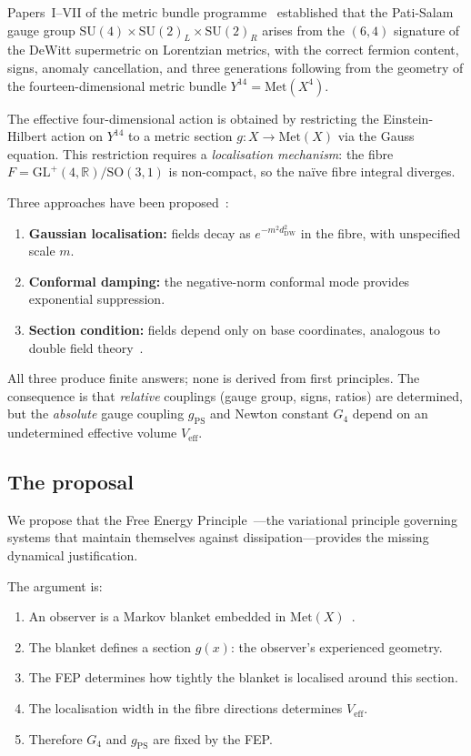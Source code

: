 \documentclass[12pt, a4paper]{article}
\theoremstyle{definition}
\theoremstyle{remark}
\newcommand{\R}{\mathbb{R}}
\newcommand{\Met}{\mathrm{Met}}
\newcommand{\SU}{\mathrm{SU}}
\newcommand{\SO}{\mathrm{SO}}
\newcommand{\GL}{\mathrm{GL}}
\newcommand{\Veff}{V_{\mathrm{eff}}}
\newcommand{\gPS}{g_{\mathrm{PS}}}
\begin{document}
Papers~I--VII of the metric bundle programme~\cite{Paper1,Paper3,Paper7} established that the Pati-Salam gauge group $\SU(4) \times \SU(2)_L \times \SU(2)_R$ arises from the $(6,4)$ signature of the DeWitt supermetric on Lorentzian metrics, with the correct fermion content, signs, anomaly cancellation, and three generations following from the geometry of the fourteen-dimensional metric bundle $Y^{14} = \Met(X^4)$.

The effective four-dimensional action is obtained by restricting the Einstein-Hilbert action on $Y^{14}$ to a metric section $g: X \to \Met(X)$ via the Gauss equation.
This restriction requires a \emph{localisation mechanism}: the fibre $F = \GL^+(4,\R)/\SO(3,1)$ is non-compact, so the na\"ive fibre integral diverges.

Three approaches have been proposed~\cite{Paper1,Paper3}:
\begin{enumerate}[nosep]
\item \textbf{Gaussian localisation:} fields decay as $e^{-m^2 d^2_{\mathrm{DW}}}$ in the fibre, with unspecified scale $m$.
\item \textbf{Conformal damping:} the negative-norm conformal mode provides exponential suppression.
\item \textbf{Section condition:} fields depend only on base coordinates, analogous to double field theory~\cite{HullZwiebach2009}.
\end{enumerate}
All three produce finite answers; none is derived from first principles.
The consequence is that \emph{relative} couplings (gauge group, signs, ratios) are determined, but the \emph{absolute} gauge coupling $\gPS$ and Newton constant $G_4$ depend on an undetermined effective volume $\Veff$.

\subsection{The proposal}

We propose that the Free Energy Principle~\cite{Friston2010,Friston2019}---the variational principle governing systems that maintain themselves against dissipation---provides the missing dynamical justification.

The argument is:
\begin{enumerate}[nosep]
\item An observer is a Markov blanket embedded in $\Met(X)$~\cite{Paper6}.
\item The blanket defines a section $g(x)$: the observer's experienced geometry.
\item The FEP determines how tightly the blanket is localised around this section.
\item The localisation width in the fibre directions determines $\Veff$.
\item Therefore $G_4$ and $\gPS$ are fixed by the FEP.
\end{enumerate}
\end{document}
